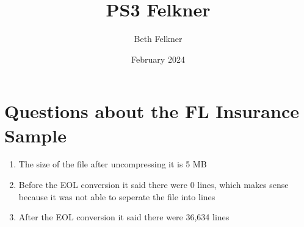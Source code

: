 \documentclass{article}
\title{PS3 Felkner}
\author{Beth Felkner }
\date{February 2024}
\begin{document}
\maketitle

\section{Questions about the FL Insurance Sample}
\begin{enumerate}

\item The size of the file after uncompressing it is 5 MB
\item Before the EOL conversion it said there were 0 lines, which makes sense because it was not able to seperate the file into lines
\item After the EOL conversion it said there were 36,634 lines

\end{enumerate}
\end{document}
